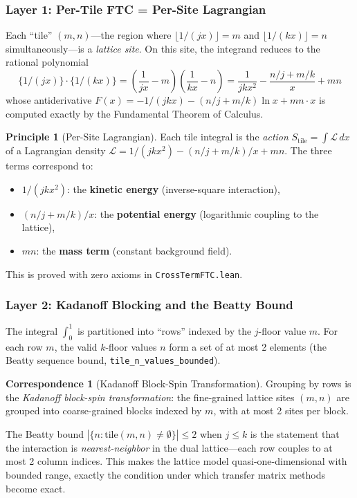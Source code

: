 \documentclass[11pt,a4paper]{article}
\theoremstyle{definition}
\newtheorem{principle}[definition]{Principle}
\newtheorem{correspondence}[definition]{Correspondence}
\newcommand{\fract}[1]{\{#1\}}
\newcommand{\lean}[1]{\texttt{#1}}
\begin{document}
\subsubsection{Layer 1: Per-Tile FTC = Per-Site Lagrangian}

Each ``tile'' $(m,n)$---the region where $\lfloor 1/(jx) \rfloor = m$
and $\lfloor 1/(kx) \rfloor = n$ simultaneously---is a \emph{lattice site}.
On this site, the integrand reduces to the rational polynomial
\[
  \fract{1/(jx)} \cdot \fract{1/(kx)} =
  \left(\frac{1}{jx} - m\right)\left(\frac{1}{kx} - n\right)
  = \frac{1}{jkx^2} - \frac{n/j + m/k}{x} + mn
\]
whose antiderivative $F(x) = -1/(jkx) - (n/j + m/k)\ln x + mn \cdot x$
is computed exactly by the Fundamental Theorem of Calculus.

\begin{principle}[Per-Site Lagrangian]
Each tile integral is the \emph{action} $S_{\mathrm{tile}} = \int \mathcal{L}\,dx$
of a Lagrangian density $\mathcal{L} = 1/(jkx^2) - (n/j+m/k)/x + mn$.
The three terms correspond to:
\begin{itemize}
  \item $1/(jkx^2)$: the \textbf{kinetic energy} (inverse-square interaction),
  \item $(n/j + m/k)/x$: the \textbf{potential energy} (logarithmic coupling to the lattice),
  \item $mn$: the \textbf{mass term} (constant background field).
\end{itemize}
This is proved with zero axioms in \lean{CrossTermFTC.lean}.
\end{principle}

\subsubsection{Layer 2: Kadanoff Blocking and the Beatty Bound}

The integral $\int_0^1$ is partitioned into ``rows'' indexed by the
$j$-floor value $m$. For each row $m$, the valid $k$-floor values
$n$ form a set of at most 2 elements (the Beatty sequence bound,
\lean{tile\_n\_values\_bounded}).

\begin{correspondence}[Kadanoff Block-Spin Transformation]
Grouping by rows is the \emph{Kadanoff block-spin transformation}:
the fine-grained lattice sites $(m,n)$ are grouped into coarse-grained
blocks indexed by $m$, with at most 2 sites per block.

The Beatty bound $|\{n : \text{tile}(m,n) \neq \emptyset\}| \leq 2$
when $j \leq k$ is the statement that the interaction is
\emph{nearest-neighbor} in the dual lattice---each row couples to at
most 2 column indices. This makes the lattice model quasi-one-dimensional
with bounded range, exactly the condition under which transfer matrix
methods become exact.
\end{correspondence}
\end{document}
